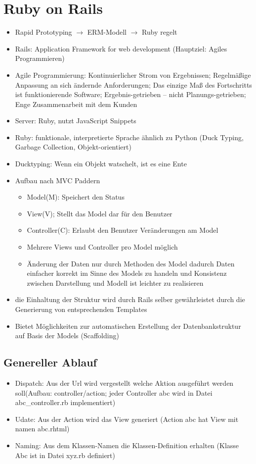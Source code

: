 \documentclass{article} %
\begin{document}
	
\section{Ruby on Rails}
	\begin{itemize}
		\item Rapid Prototyping $\rightarrow$ ERM-Modell $\rightarrow$ Ruby regelt
		\item Rails: Application Framework for web development (Hauptziel: Agiles Programmieren)
		\item Agile Programmierung: Kontinuierlicher Strom von Ergebnissen; Regelmäßige Anpassung an sich ändernde Anforderungen; Das einzige Maß des Fortschritts ist funktionierende Software; Ergebnis-getrieben – nicht Planungs-getrieben; Enge Zusammenarbeit mit dem Kunden
		\item Server: Ruby, nutzt JavaScript Snippets
		\item Ruby: funktionale, interpretierte Sprache ähnlich zu Python (Duck Typing, Garbage Collection, Objekt-orientiert)
		\item Ducktyping: Wenn ein Objekt watschelt, ist es eine Ente
		\item Aufbau nach MVC Paddern
		\begin{itemize}
			\item Model(M): Speichert den Status
			\item View(V); Stellt das Model dar für den Benutzer
			\item Controller(C): Erlaubt den Benutzer Veränderungen am Model
			\item Mehrere Views und Controller pro Model möglich
			\item Änderung der Daten nur durch Methoden des Model dadurch Daten einfacher korrekt im Sinne des Models zu handeln und  Konsistenz zwischen Darstellung und Modell ist leichter zu realisieren
		\end{itemize}
		\item die Einhaltung der Struktur wird durch Rails selber gewährleistet durch die Generierung von entsprechenden Templates
		\item Bietet Möglichkeiten zur automatischen Erstellung der Datenbankstruktur auf Basis der Models (Scaffolding)
	\end{itemize}
	\subsection{Genereller Ablauf}
	\begin{itemize}
		\item Dispatch: Aus der Url wird vergestellt welche Aktion ausgeführt werden soll(Aufbau: controller/action; jeder Controller abc wird in Datei abc\_controller.rb implementiert)
		\item Udate: Aus der Action wird das View generiert (Action abc hat View mit namen abc.rhtml)
		\item Naming: Aus dem Klassen-Namen die Klassen-Definition erhalten (Klasse Abc ist in Datei xyz.rb definiert)
	\end{itemize}
	
\end{document}

